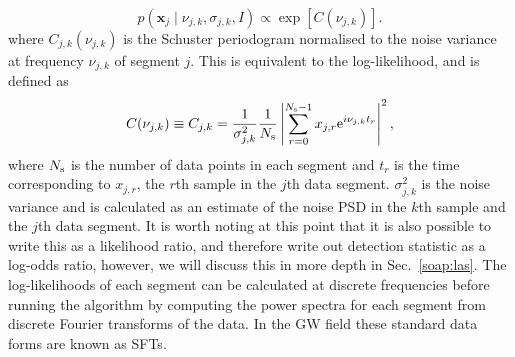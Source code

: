 %
\begin{equation}
\label{soap:single:likelihood}
p({\bm x_j} \mid \nu_{j,k}, \sigma_{j,k}, I) \propto
\exp\left[{C(\nu_{j,k})}\right].
\end{equation}
%
where
$C_{j,k}(\nu_{j,k})$ is the Schuster periodogram normalised to the noise variance at
frequency $\nu_{j,k}$ of segment $j$. This is equivalent to the log-likelihood, and is defined as
%
\begin{equation}
\label{soap:periodogram}
C(\nu_{j,k}) \equiv C_{j,k}=  \frac{1}{\sigma_{j,k}^2}\frac{1}{N_{\rm s}}\left|\sum_{r=0}^{N_{\rm
s}-1}x_{j,r} {\rm
e}^{i\nu_{j,k} t_r}\right|^2,
\end{equation}
%
where $N_{\rm s}$ is the number of data points in each segment and $t_{r}$ is the time corresponding to $x_{j,r}$, the $r$th sample in the $j$th data segment. $\sigma_{j,k}^2$ is the noise variance and is calculated as an estimate of the noise \gls{PSD} in the $k$th sample and the $j$th data segment. It is worth noting at this point that it is also possible to write this as a likelihood ratio, and therefore write out detection statistic as a log-odds ratio, however, we will discuss this in more depth in Sec.~\ref{soap:las}. The log-likelihoods of each segment can be calculated at discrete frequencies before running the algorithm by computing the power spectra for each segment from discrete Fourier transforms of the data. In the \gls{GW} field these standard data forms are known as \glspl{SFT}.

